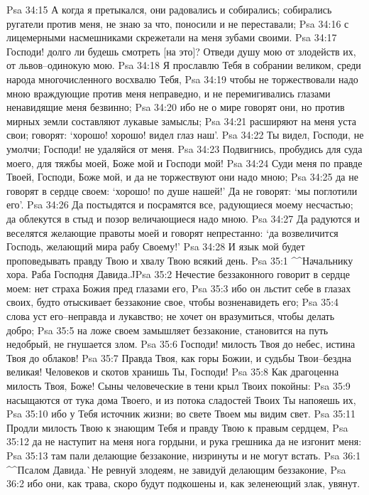 Psa 34:15  А когда я претыкался, они радовались и собирались; собирались ругатели против меня, не знаю за что, поносили и не переставали;
Psa 34:16  с лицемерными насмешниками скрежетали на меня зубами своими.
Psa 34:17  Господи! долго ли будешь смотреть [на это]? Отведи душу мою от злодейств их, от львов--одинокую мою.
Psa 34:18  Я прославлю Тебя в собрании великом, среди народа многочисленного восхвалю Тебя,
Psa 34:19  чтобы не торжествовали надо мною враждующие против меня неправедно, и не перемигивались глазами ненавидящие меня безвинно;
Psa 34:20  ибо не о мире говорят они, но против мирных земли составляют лукавые замыслы;
Psa 34:21  расширяют на меня уста свои; говорят: `хорошо! хорошо! видел глаз наш'.
Psa 34:22  Ты видел, Господи, не умолчи; Господи! не удаляйся от меня.
Psa 34:23  Подвигнись, пробудись для суда моего, для тяжбы моей, Боже мой и Господи мой!
Psa 34:24  Суди меня по правде Твоей, Господи, Боже мой, и да не торжествуют они надо мною;
Psa 34:25  да не говорят в сердце своем: `хорошо! по душе нашей!' Да не говорят: `мы поглотили его'.
Psa 34:26  Да постыдятся и посрамятся все, радующиеся моему несчастью; да облекутся в стыд и позор величающиеся надо мною.
Psa 34:27  Да радуются и веселятся желающие правоты моей и говорят непрестанно: `да возвеличится Господь, желающий мира рабу Своему!'
Psa 34:28  И язык мой будет проповедывать правду Твою и хвалу Твою всякий день.
Psa 35:1  ^^Начальнику хора. Раба Господня Давида.^^
Psa 35:2  Нечестие беззаконного говорит в сердце моем: нет страха Божия пред глазами его,
Psa 35:3  ибо он льстит себе в глазах своих, будто отыскивает беззаконие свое, чтобы возненавидеть его;
Psa 35:4  слова уст его--неправда и лукавство; не хочет он вразумиться, чтобы делать добро;
Psa 35:5  на ложе своем замышляет беззаконие, становится на путь недобрый, не гнушается злом.
Psa 35:6  Господи! милость Твоя до небес, истина Твоя до облаков!
Psa 35:7  Правда Твоя, как горы Божии, и судьбы Твои--бездна великая! Человеков и скотов хранишь Ты, Господи!
Psa 35:8  Как драгоценна милость Твоя, Боже! Сыны человеческие в тени крыл Твоих покойны:
Psa 35:9  насыщаются от тука дома Твоего, и из потока сладостей Твоих Ты напояешь их,
Psa 35:10  ибо у Тебя источник жизни; во свете Твоем мы видим свет.
Psa 35:11  Продли милость Твою к знающим Тебя и правду Твою к правым сердцем,
Psa 35:12  да не наступит на меня нога гордыни, и рука грешника да не изгонит меня:
Psa 35:13  там пали делающие беззаконие, низринуты и не могут встать.
Psa 36:1  ^^Псалом Давида.^^ Не ревнуй злодеям, не завидуй делающим беззаконие,
Psa 36:2  ибо они, как трава, скоро будут подкошены и, как зеленеющий злак, увянут.
